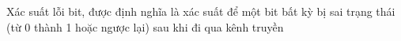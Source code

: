 \documentclass[preview]{standalone}
\begin{document}
\begin{center}
Xác suất lỗi bit, được định nghĩa là xác suất để một bit bất kỳ bị sai trạng thái (từ 0 thành 1 hoặc ngược lại) sau khi đi qua kênh truyền
\end{center}
\end{document}
